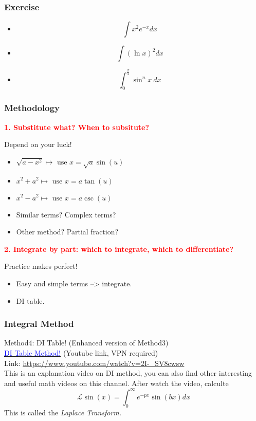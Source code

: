 \documentclass{beamer}
\newcommand{\myfont}{\rmfamily\normalsize\upshape\mdseries}
\begin{document}
\begin{frame}
    \frametitle{Exercise}

    \begin{itemize}
        \item $$\int x^2 e^{-x} dx$$
        \item $$\int (\ln x)^2 dx$$
        \item $$\int_0^{\frac{\pi}{2}} \sin^n x ~dx$$
    \end{itemize}

\end{frame}
\begin{frame}
    \frametitle{Methodology}
    \textbf{\textcolor{red}{1. Substitute what? When to subsitute?}}
    \begin{block}{Depend on your luck!}
        \begin{itemize}
            \item $\sqrt{a- x^2} \mapsto \text{ use } x=\sqrt{a}\sin(u)$
            \item $x^2+a^2 \mapsto \text{ use } x=a\tan (u)$
            \item $x^2-a^2 \mapsto \text{ use } x=a \csc(u)$
            \item Similar terms? Complex terms?
            \item Other method? Partial fraction?
        \end{itemize}
    \end{block}
    \textbf{\textcolor{red}{2. Integrate by part: which to integrate, which to differentiate?}}
    \begin{block}{Practice makes perfect!}
        \begin{itemize}
            \item Easy and simple terms --> integrate.
            \item DI table.
        \end{itemize}
    \end{block}
\end{frame}
\begin{frame}
    \frametitle{Integral Method}
    Method4: DI Table! (Enhanced version of Method3)
    \\
    \vspace{3em}\hspace{1em}
    \href{https://www.youtube.com/watch?v=2I-_SV8cwsw}{\large{\textcolor{blue}{DI Table Method!}}}
    (Youtube link, VPN required) \\
    \hspace{1em} Link: \url{https://www.youtube.com/watch?v=2I-_SV8cwsw}
    \vspace{1em}
    \\\hspace{1em}
This is an explanation video on DI method, you can also find other
interesting and useful math videos on this channel. After watch the video, calculte
$$\mathcal{L}\sin(x)=\int_0^{\infty} e^{-px} \sin(bx) dx$$
This is called the \itshape Laplace Transform.\myfont
\end{frame}
\end{document}
